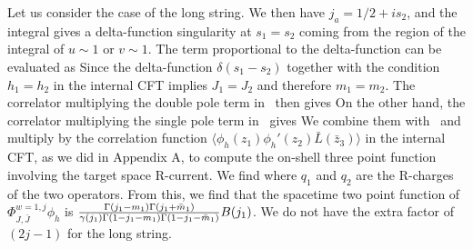 Let us consider the case of the long string. We then have
$j_a = 1/2 + is_2$, and
the integral gives a delta-function singularity at $s_1=s_2$ coming
from the region of the integral of $u\sim 1$ or $v\sim 1$.
The term proportional to the delta-function can be evaluated as
\eqn{}
Since
\eqn{}
the delta-function $\delta(s_1-s_2)$ together with
the condition $h_1=h_2$ in the internal CFT implies
$J_1=J_2$ and therefore $m_1=m_2$.
The correlator multiplying the
double pole term in \threeptwardid\ then gives
\eqn{}
On the other hand, the correlator multiplying the
single pole term in \threeptwardid\ gives
\eqn{}
We combine them with \fateofc\ and
 multiply by the correlation function
 $\langle \phi_h(z_1) \phi_h'(z_2) \bar{L}(\bar{z}_3)
\rangle $  in
the internal CFT, as we did in Appendix A,
to compute the on-shell three point function involving
the target space R-current. We find
\eqn{}
where $q_1$ and $q_2$ are the R-charges of the two
operators.
{}From this, we find that the spacetime
two point function of $\Phi_{J,\bar J}^{w=1,j} \phi_h$
is ${\Gamma(j_1-m_1)\Gamma(j_1+\bar m_1)
\over \gamma(j_1) \Gamma(1-j_1-m_1)
\Gamma(1-j_1-\bar m_1)} B(j_1)$. We do not have
the extra factor of $(2j-1)$ for the long string.



\listrefs

\bye



